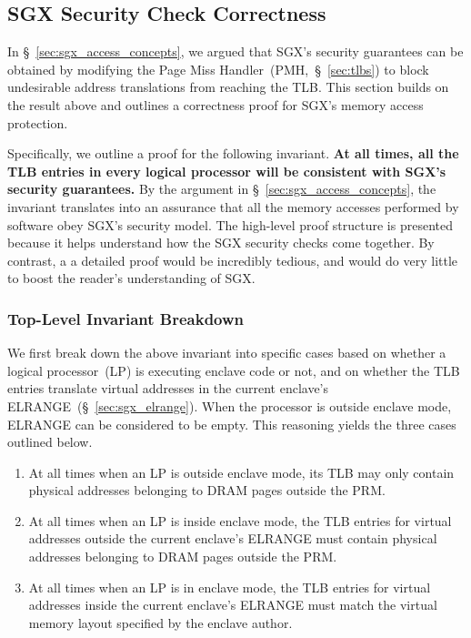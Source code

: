 \subsection{SGX Security Check Correctness}
\label{sec:sgx_access_correctness}

In \S~\ref{sec:sgx_access_concepts}, we argued that SGX's security guarantees
can be obtained by modifying the Page Miss Handler~(PMH,~\S~\ref{sec:tlbs}) to
block undesirable address translations from reaching the TLB. This section
builds on the result above and  outlines a correctness proof for SGX's memory
access protection.

Specifically, we outline a proof for the following invariant. \textbf{At all
times, all the TLB entries in every logical processor will be consistent with
SGX's security guarantees.} By the argument in
\S~\ref{sec:sgx_access_concepts}, the invariant translates into an assurance
that all the memory accesses performed by software obey SGX's security model.
The high-level proof structure is presented because it helps understand how the
SGX security checks come together. By contrast, a a detailed proof would be
incredibly tedious, and would do very little to boost the reader's
understanding of SGX.


\subsubsection{Top-Level Invariant Breakdown}

We first break down the above invariant into specific cases based on whether
a logical processor~(LP) is executing enclave code or not, and on whether the
TLB entries translate virtual addresses in the current enclave's
ELRANGE~(\S~\ref{sec:sgx_elrange}). When the processor is outside enclave mode,
ELRANGE can be considered to be empty. This reasoning yields the three cases
outlined below.

\begin{enumerate}
\item At all times when an LP is outside enclave mode, its TLB may only contain
  physical addresses belonging to DRAM pages outside the PRM.
\item At all times when an LP is inside enclave mode, the TLB entries for
  virtual addresses outside the current enclave's ELRANGE must contain physical
  addresses belonging to DRAM pages outside the PRM.
\item At all times when an LP is in enclave mode, the TLB entries for virtual
  addresses inside the current enclave's ELRANGE must match the virtual memory
  layout specified by the enclave author.
\end{enumerate}

